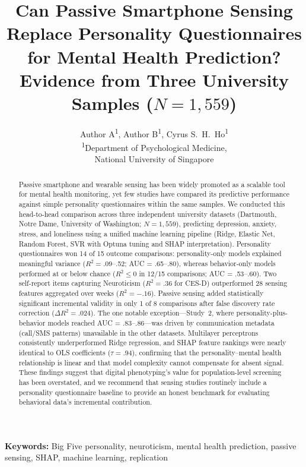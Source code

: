 \documentclass[12pt, a4paper]{article}
\title{Can Passive Smartphone Sensing Replace Personality Questionnaires\\
       for Mental Health Prediction? Evidence from Three University\\
       Samples ($N = 1{,}559$)}
\author{
  Author A\textsuperscript{1},
  Author B\textsuperscript{1},
  Cyrus S.~H.~Ho\textsuperscript{1}
  \\[6pt]
  \textsuperscript{1}Department of Psychological Medicine,\\
  National University of Singapore
}
\date{}
\begin{document}
\maketitle

\begin{abstract}
Passive smartphone and wearable sensing has been widely promoted as a scalable tool for mental health monitoring, yet few studies have compared its predictive performance against simple personality questionnaires within the same samples. We conducted this head-to-head comparison across three independent university datasets (Dartmouth, Notre Dame, University of Washington; $N = 1{,}559$), predicting depression, anxiety, stress, and loneliness using a unified machine learning pipeline (Ridge, Elastic Net, Random Forest, SVR with Optuna tuning and SHAP interpretation). Personality questionnaires won 14 of 15 outcome comparisons: personality-only models explained meaningful variance ($R^2 = .09$--.52; AUC = .65--.80), whereas behavior-only models performed at or below chance ($R^2 \leq 0$ in 12/15 comparisons; AUC = .53--.60). Two self-report items capturing Neuroticism ($R^2 = .36$ for CES-D) outperformed 28 sensing features aggregated over weeks ($R^2 = -.16$). Passive sensing added statistically significant incremental validity in only 1 of 8 comparisons after false discovery rate correction ($\Delta R^2 = .024$). The one notable exception---Study~2, where personality-plus-behavior models reached AUC = .83--.86---was driven by communication metadata (call/SMS patterns) unavailable in the other datasets. Multilayer perceptrons consistently underperformed Ridge regression, and SHAP feature rankings were nearly identical to OLS coefficients ($\tau = .94$), confirming that the personality--mental health relationship is linear and that model complexity cannot compensate for absent signal. These findings suggest that digital phenotyping's value for population-level screening has been overstated, and we recommend that sensing studies routinely include a personality questionnaire baseline to provide an honest benchmark for evaluating behavioral data's incremental contribution.
\end{abstract}

\textbf{Keywords:} Big Five personality, neuroticism, mental health prediction, passive sensing, SHAP, machine learning, replication

\newpage

\end{document}
